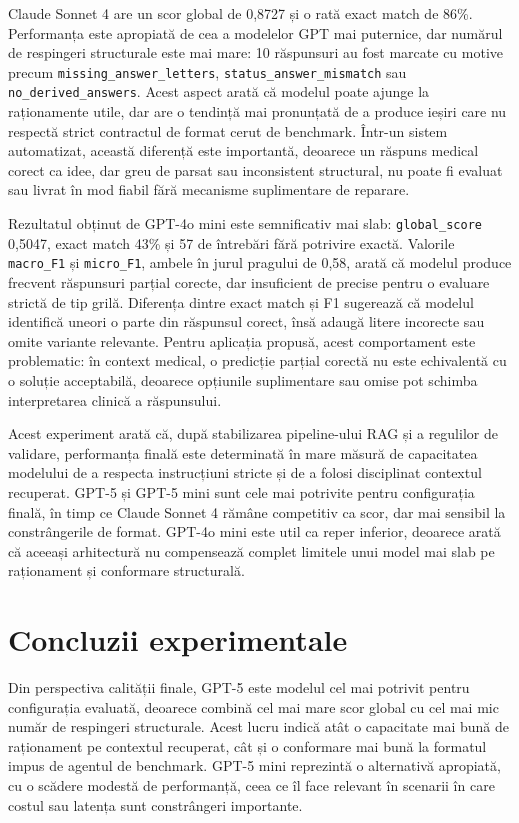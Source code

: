 \documentclass[12pt, a4paper, oneside, romanian]{teza-upb}
\begin{document}
Claude Sonnet 4 are un scor global de 0,8727 și o rată exact match de 86\%. Performanța este apropiată de cea a modelelor GPT mai puternice, dar numărul de respingeri structurale este mai mare: 10 răspunsuri au fost marcate cu motive precum \texttt{missing\_answer\_letters}, \texttt{status\_answer\_mismatch} sau \texttt{no\_derived\_answers}. Acest aspect arată că modelul poate ajunge la raționamente utile, dar are o tendință mai pronunțată de a produce ieșiri care nu respectă strict contractul de format cerut de benchmark. Într-un sistem automatizat, această diferență este importantă, deoarece un răspuns medical corect ca idee, dar greu de parsat sau inconsistent structural, nu poate fi evaluat sau livrat în mod fiabil fără mecanisme suplimentare de reparare.

Rezultatul obținut de GPT-4o mini este semnificativ mai slab: \texttt{global\_score} 0,5047, exact match 43\% și 57 de întrebări fără potrivire exactă. Valorile \texttt{macro\_F1} și \texttt{micro\_F1}, ambele în jurul pragului de 0,58, arată că modelul produce frecvent răspunsuri parțial corecte, dar insuficient de precise pentru o evaluare strictă de tip grilă. Diferența dintre exact match și F1 sugerează că modelul identifică uneori o parte din răspunsul corect, însă adaugă litere incorecte sau omite variante relevante. Pentru aplicația propusă, acest comportament este problematic: în context medical, o predicție parțial corectă nu este echivalentă cu o soluție acceptabilă, deoarece opțiunile suplimentare sau omise pot schimba interpretarea clinică a răspunsului.

Acest experiment arată că, după stabilizarea pipeline-ului RAG și a regulilor de validare, performanța finală este determinată în mare măsură de capacitatea modelului de a respecta instrucțiuni stricte și de a folosi disciplinat contextul recuperat. GPT-5 și GPT-5 mini sunt cele mai potrivite pentru configurația finală, în timp ce Claude Sonnet 4 rămâne competitiv ca scor, dar mai sensibil la constrângerile de format. GPT-4o mini este util ca reper inferior, deoarece arată că aceeași arhitectură nu compensează complet limitele unui model mai slab pe raționament și conformare structurală.

\section{Concluzii experimentale}

Din perspectiva calității finale, GPT-5 este modelul cel mai potrivit pentru configurația evaluată, deoarece combină cel mai mare scor global cu cel mai mic număr de respingeri structurale. Acest lucru indică atât o capacitate mai bună de raționament pe contextul recuperat, cât și o conformare mai bună la formatul impus de agentul de benchmark. GPT-5 mini reprezintă o alternativă apropiată, cu o scădere modestă de performanță, ceea ce îl face relevant în scenarii în care costul sau latența sunt constrângeri importante.
\end{document}
